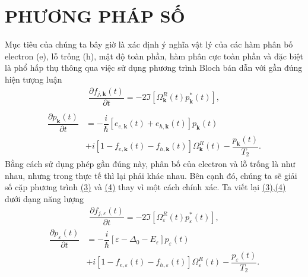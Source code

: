 \documentclass[%
reprint,
amsmath,amssymb,
superscriptaddress,
aps,
]{revtex4-2}
\newcommand{\f}[2]{\dfrac{#1}{#2}}
\begin{document}
\section{\label{sec:level2} PHƯƠNG PHÁP SỐ}
Mục tiêu của chúng ta bây giờ là xác định ý nghĩa vật lý của các hàm phân bố electron (e), lỗ trống (h), mật độ toàn phần, hàm phân cực toàn phần và đặc biệt là phổ hấp thụ thông qua việc sử dụng phương trình Bloch bán dẫn với gần đúng hiện tượng luận
\begin{equation}
	\begin{aligned}
		\f{\partial f_{j,\mathbf{k}} (t)}{\partial t} = - 2 \Im \left[ \Omega_{\mathbf{k}}^{R}(t) p^{*}_{\mathbf{k}}(t)\right], \label{Eq:3}\\
	\end{aligned}
\end{equation}
\begin{equation}
	\begin{aligned}
		\f{\partial p_{\mathbf{k}}(t)}{\partial t} 
		&= - \f{i}{\hbar} \left[ e_{e,\mathbf{k}}(t) + e_{h,\mathbf{k}}(t)  \right] p_{\mathbf{k}}(t) \\
		&+ i \left[ 1 - f_{e,\mathbf{k}}(t) - f_{h,\mathbf{k}}(t) \right] \Omega_{\mathbf{k}}^{R}(t) - \f{p_{\mathbf{k}}(t)}{T_{2}}. \label{Eq:4}
	\end{aligned}
\end{equation}
Bằng cách sử dụng phép gần đúng này, phân bố của electron và lỗ trống là như nhau, nhưng trong thực tế thì lại phải khác nhau. Bên cạnh đó, chúng ta sẽ giải số cặp phương trình \hyperref[Eq:3]{(3)} và \hyperref[Eq:4]{(4)} thay vì một cách chính xác. Ta viết lại \hyperref[Eq:3]{(3)},\hyperref[Eq:4]{(4)} dưới dạng năng lượng
\begin{equation}
	\begin{aligned}
		\f{\partial f_{j,\varepsilon} (t)}{\partial t} = - 2 \Im \left[ \Omega_{\varepsilon}^{R}(t) p^{*}_{\varepsilon}(t)\right], \label{Eq:5}
	\end{aligned}
\end{equation}
\begin{equation}
	\begin{aligned}
		\f{\partial p_{\varepsilon}(t)}{\partial t} 
		&= - \f{i}{\hbar} \left[ \varepsilon - \Delta_{0} - E_{\varepsilon}  \right] p_{\varepsilon}(t) \\
		&+ i \left[ 1 - f_{e,\varepsilon}(t) - f_{h,\varepsilon}(t) \right] \Omega_{\varepsilon}^{R}(t) - \f{p_{\varepsilon}(t)}{T_{2}}. \label{Eq:6}
	\end{aligned}
\end{equation}
\end{document}
